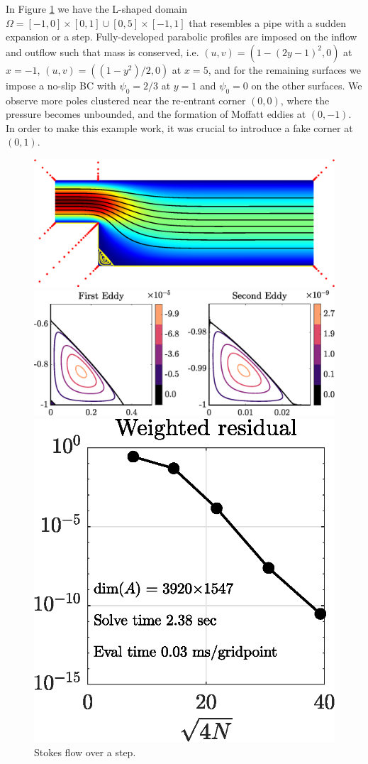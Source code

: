 \begin{example}
\label{ex:step}
In Figure \ref{fig:step} we have the L-shaped domain $\Omega = [-1,0] \times [0,1] \cup [0,5]\times[-1,1]$ that resembles a pipe with a sudden expansion or a step. Fully-developed parabolic profiles are imposed on the inflow and outflow such that mass is conserved, i.e. $(u,v)=(1-(2y-1)^2,0)$ at $x=-1$, $(u,v)=((1-y^2)/2,0)$ at $x=5$, and for the remaining surfaces we impose a no-slip BC with $\psi_0=2/3$ at $y=1$ and $\psi_0=0$ on the other surfaces. We observe more poles clustered near the re-entrant corner $(0,0)$, where the pressure becomes unbounded, and the formation of Moffatt eddies at $(0,-1)$. In order to make this example work, it was crucial to introduce a fake corner at $(0,1)$.
\begin{figure}[H]
	\centering
	\includegraphics[width=\linewidth]{Figures/step}
	
	\vspace{2em}
	\includegraphics[width=\linewidth]{Figures/step_eddy}
	
	\vspace{2em}
	\includegraphics[width=0.5\linewidth]{Figures/step_conv}

	\caption{Stokes flow over a step.}
	\label{fig:step}
\end{figure} 
\end{example}

